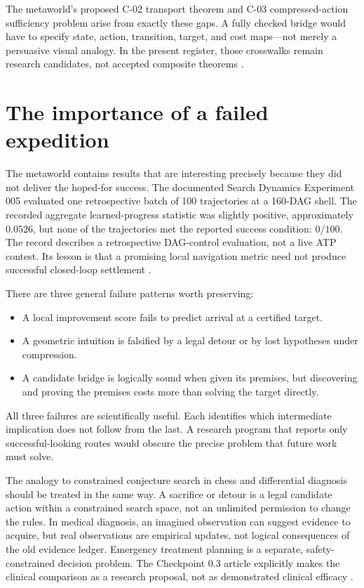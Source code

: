 \documentclass[11pt,letterpaper,oneside]{article}
\begin{document}
The metaworld's proposed C-02 transport theorem and C-03 compressed-action sufficiency problem arise from exactly these gaps. A fully checked bridge would have to specify state, action, transition, target, and cost maps---not merely a persuasive visual analogy. In the present register, those crosswalks remain research candidates, not accepted composite theorems \cite{checkpoint}.

\section{The importance of a failed expedition}
The metaworld contains results that are interesting precisely because they did not deliver the hoped-for success. The documented Search Dynamics Experiment 005 evaluated one retrospective batch of 100 trajectories at a 160-DAG shell. The recorded aggregate learned-progress statistic was slightly positive, approximately $0.0526$, but none of the trajectories met the reported success condition: $0/100$. The record describes a retrospective DAG-control evaluation, not a live ATP contest. Its lesson is that a promising local navigation metric need not produce successful closed-loop settlement \cite{checkpoint}.

There are three general failure patterns worth preserving:
\begin{itemize}
\item A local improvement score fails to predict arrival at a certified target.
\item A geometric intuition is falsified by a legal detour or by lost hypotheses under compression.
\item A candidate bridge is logically sound when given its premises, but discovering and proving the premises costs more than solving the target directly.
\end{itemize}
All three failures are scientifically useful. Each identifies which intermediate implication does not follow from the last. A research program that reports only successful-looking routes would obscure the precise problem that future work must solve.

The analogy to constrained conjecture search in chess and differential diagnosis should be treated in the same way. A sacrifice or detour is a legal candidate action within a constrained search space, not an unlimited permission to change the rules. In medical diagnosis, an imagined observation can suggest evidence to acquire, but real observations are empirical updates, not logical consequences of the old evidence ledger. Emergency treatment planning is a separate, safety-constrained decision problem. The Checkpoint 0.3 article explicitly makes the clinical comparison as a research proposal, not as demonstrated clinical efficacy \cite{checkpoint}.
\end{document}
